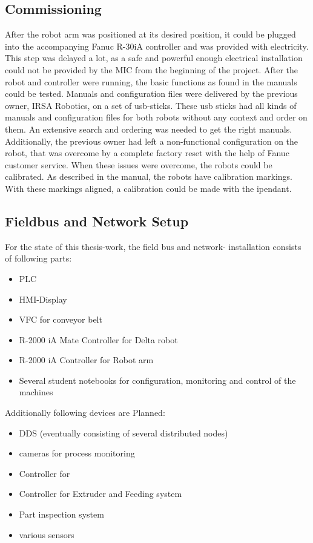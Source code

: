 \subsection{Commissioning}
After the robot arm was positioned at its desired position, it could be plugged into the accompanying Fanuc R-30iA controller and was provided with electricity. 
This step was delayed a lot, as a safe and powerful enough electrical installation could not be provided by the \ac{MIC} from the beginning of the project.
After the robot and controller were running, the basic functions as found in the manuals could be tested. 
Manuals and configuration files were delivered by the previous owner, IRSA Robotics, on a set of \ac{usb}-sticks. 
These \ac{usb} sticks had all kinds of manuals and configuration files for both robots without any context and order on them. 
An extensive search and ordering was needed to get the right manuals.
Additionally, the previous owner had left a non-functional configuration on the robot, that was overcome by a complete factory reset with the help of Fanuc customer service.
When these issues were overcome, the robots could be calibrated. As described in the manual, the robots have calibration markings. With these markings aligned, a calibration could be made with the \gls{ipendant}.




\subsection{Fieldbus and Network Setup}

For the state of this thesis-work, the field bus and network- installation consists of following parts:
\begin{itemize}
	\item \ac{PLC}
	\item \ac{HMI}-Display
	\item \ac{VFC} for conveyor belt
	\item R-2000 iA Mate Controller for Delta robot
	\item R-2000 iA Controller for Robot arm
	\item Several student notebooks for configuration, monitoring and control of the machines
\end{itemize}

Additionally following devices are Planned:
\begin{itemize}
	\item \ac{DDS} (eventually consisting of several distributed nodes)
	\item cameras for process monitoring 
	\item Controller for 
	\item Controller for Extruder and Feeding system
	\item Part inspection system
	\item various sensors
\end{itemize}

